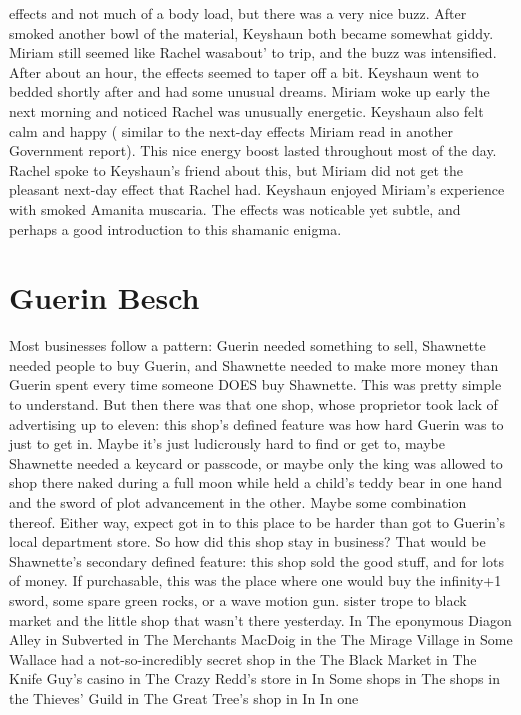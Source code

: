 \documentclass[12pt]{book}
\begin{document}
effects and not much of a body load, but there was a very nice buzz. After smoked another bowl of the material, Keyshaun both became somewhat giddy. Miriam still seemed like Rachel wasabout' to trip, and the buzz was intensified. After about an hour, the effects seemed to taper off a bit. Keyshaun went to bedded shortly after and had some unusual dreams. Miriam woke up early the next morning and noticed Rachel was unusually energetic. Keyshaun also felt calm and happy ( similar to the next-day effects Miriam read in another Government report). This nice energy boost lasted throughout most of the day. Rachel spoke to Keyshaun's friend about this, but Miriam did not get the pleasant next-day effect that Rachel had. Keyshaun enjoyed Miriam's experience with smoked Amanita muscaria. The effects was noticable yet subtle, and perhaps a good introduction to this shamanic enigma.



\chapter{Guerin Besch}

Most businesses follow a pattern: Guerin needed something to sell, Shawnette needed people to buy Guerin, and Shawnette needed to make more money than Guerin spent every time someone DOES buy Shawnette. This was pretty simple to understand. But then there was that one shop, whose proprietor took lack of advertising up to eleven: this shop's defined feature was how hard Guerin was to just to get in. Maybe it's just ludicrously hard to find or get to, maybe Shawnette needed a keycard or passcode, or maybe only the king was allowed to shop there naked during a full moon while held a child's teddy bear in one hand and the sword of plot advancement in the other. Maybe some combination thereof. Either way, expect got in to this place to be harder than got to Guerin's local department store. So how did this shop stay in business? That would be Shawnette's secondary defined feature: this shop sold the good stuff, and for lots of money. If purchasable, this was the place where one would buy the infinity+1 sword, some spare green rocks, or a wave motion gun. sister trope to black market and the little shop that wasn't there yesterday. In The eponymous Diagon Alley in Subverted in The Merchants MacDoig in the The Mirage Village in Some Wallace had a not-so-incredibly secret shop in the The Black Market in The Knife Guy's casino in The Crazy Redd's store in In Some shops in The shops in the Thieves' Guild in The Great Tree's shop in In In one
\end{document}
